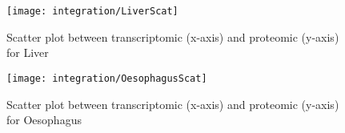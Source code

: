 \clearpage
\begin{figure}
    \texttt{[image: integration/LiverScat]}\centering
    \caption{Scatter plot between transcriptomic (x-axis) and  proteomic (y-axis)
    for Liver\label{fig:ScatterPlotLiver}}
\end{figure}



\begin{figure}
\texttt{[image: integration/OesophagusScat]}\centering
    \caption{Scatter plot between transcriptomic (x-axis) and  proteomic (y-axis)
    for Oesophagus\label{fig:ScatterPlotOesophagus}}
\end{figure}
